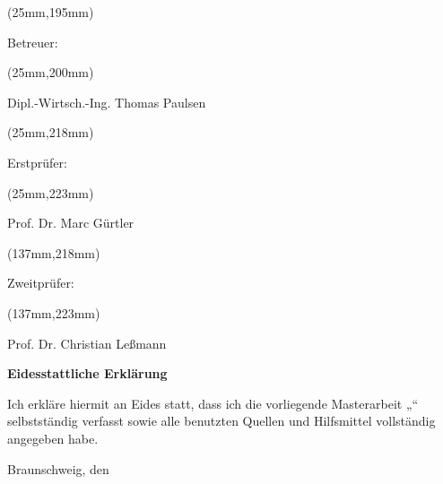\begin{titlepage}
\begin{doublespace}
\begin{textblock*}{20mm}(25mm,195mm)
\raggedright
    Betreuer:
\end{textblock*}

\begin{textblock*}{80mm}(25mm,200mm)
\raggedright
    Dipl.-Wirtsch.-Ing. Thomas Paulsen
\end{textblock*}



\begin{textblock*}{38mm}(25mm,218mm)
\raggedright
    Erstprüfer:
\end{textblock*}

\begin{textblock*}{38mm}(25mm,223mm)
\raggedright
    Prof. Dr. Marc Gürtler
\end{textblock*}



\begin{textblock*}{48mm}(137mm,218mm)
\raggedright
    Zweitprüfer:
\end{textblock*}

\begin{textblock*}{48mm}(137mm,223mm)
\raggedright
    Prof. Dr. Christian Leßmann
\end{textblock*}


\end{doublespace}
\end{titlepage}
\blankpage


\newpage

\setcounter{page}{4}

{\LARGE \textbf{Eidesstattliche Erklärung}}\\ \vspace{1cm}

Ich erkläre hiermit an Eides statt, dass ich die vorliegende  Masterarbeit „\titel“ selbstständig verfasst sowie alle benutzten Quellen und Hilfsmittel vollständig angegeben habe.\\ \vspace{1cm}

Braunschweig, den \abgabedatum\\ \vspace{1cm}

\name

